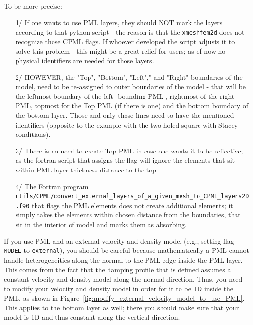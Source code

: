 \noindent
To be more precise:
\begin{itemize}
\item [1/] If one wants to use PML layers, they should NOT mark the layers according to that python script - the reason is that the \texttt{xmeshfem2d} does not recognize those CPML flags. If whoever developed the script adjusts it to solve this problem - this might be a great relief for users; as of now no physical identifiers are needed for those layers.

\item [2/] HOWEVER, the "Top", "Bottom", "Left"," and "Right" boundaries of the model, need to be re-assigned to outer boundaries of the model - that will be the leftmost boundary of the left -bounding PML , rightmost of the right PML, topmost for the Top PML (if there is one) and the bottom boundary of the bottom layer. Those and only those lines need to have the mentioned identifiers (opposite to the example with the two-holed square with Stacey conditions).

\item [3/] There is no need to create Top PML in case one wants it to be reflective; as the fortran script that assigns the flag will ignore the elements that sit within  PML-layer thickness distance to the top.

\item [4/] The Fortran program \texttt{utils/CPML/convert\_external\_layers\_of\_a\_given\_mesh\_to\_CPML\_layers2D.f90}
that flags the PML elements does not create additional elements; it simply takes the elements within chosen distance from the boundaries, that sit in the interior of model and marks them as absorbing.
\end{itemize}

\noindent
If you use PML and an external velocity and density model (e.g., setting flag \texttt{MODEL} to \texttt{external}),
you should be careful because mathematically a PML cannot handle heterogeneities along the
normal to the PML edge inside the PML layer. This comes from the fact that the damping profile
that is defined assumes a constant velocity and density model along the normal
direction.
Thus, you need to modify your velocity and density model in order for it to be 1D inside
the PML, as shown in Figure~\ref{fig:modify_external_velocity_model_to_use_PML}.
This applies to the bottom layer as well; there you should make sure
that your model is 1D and thus constant along the vertical direction.\newline

